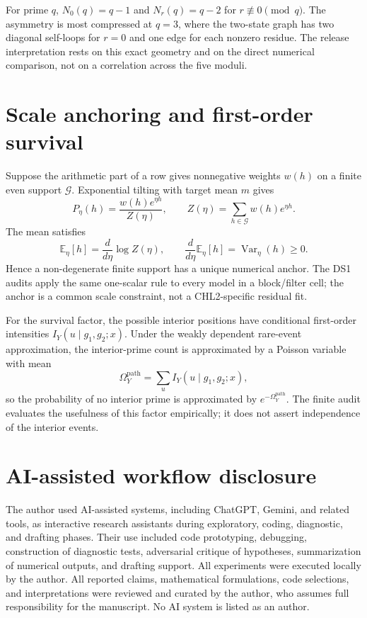 \documentclass[10pt]{article}
\begin{document}
For prime $q$, $N_0(q)=q-1$ and $N_r(q)=q-2$ for $r\not\equiv0\pmod q$.  The asymmetry is most compressed at $q=3$, where the two-state graph has two diagonal self-loops for $r=0$ and one edge for each nonzero residue.  The release interpretation rests on this exact geometry and on the direct numerical comparison, not on a correlation across the five moduli.

\section{Scale anchoring and first-order survival}\label{app:maxent-poisson}
Suppose the arithmetic part of a row gives nonnegative weights $w(h)$ on a finite even support $\mathcal G$.  Exponential tilting with target mean $m$ gives
\[
P_\eta(h)=\frac{w(h)e^{\eta h}}{Z(\eta)},
\qquad
Z(\eta)=\sum_{h\in\mathcal G}w(h)e^{\eta h}.
\]
The mean satisfies
\[
\mathbb E_\eta[h]=\frac{d}{d\eta}\log Z(\eta),
\qquad
\frac{d}{d\eta}\mathbb E_\eta[h]=\operatorname{Var}_\eta(h)\ge0.
\]
Hence a non-degenerate finite support has a unique numerical anchor.  The DS1 audits apply the same one-scalar rule to every model in a block/filter cell; the anchor is a common scale constraint, not a CHL2-specific residual fit.

For the survival factor, the possible interior positions have conditional first-order intensities $I_Y(u\mid g_1,g_2;x)$.  Under the weakly dependent rare-event approximation, the interior-prime count is approximated by a Poisson variable with mean
\[
\Omega_Y^{\mathrm{path}}=\sum_u I_Y(u\mid g_1,g_2;x),
\]
so the probability of no interior prime is approximated by $e^{-\Omega_Y^{\mathrm{path}}}$.  The finite audit evaluates the usefulness of this factor empirically; it does not assert independence of the interior events.

\section{AI-assisted workflow disclosure}
The author used AI-assisted systems, including ChatGPT, Gemini, and related tools, as interactive research assistants during exploratory, coding, diagnostic, and drafting phases.  Their use included code prototyping, debugging, construction of diagnostic tests, adversarial critique of hypotheses, summarization of numerical outputs, and drafting support.  All experiments were executed locally by the author.  All reported claims, mathematical formulations, code selections, and interpretations were reviewed and curated by the author, who assumes full responsibility for the manuscript.  No AI system is listed as an author.
\end{document}
